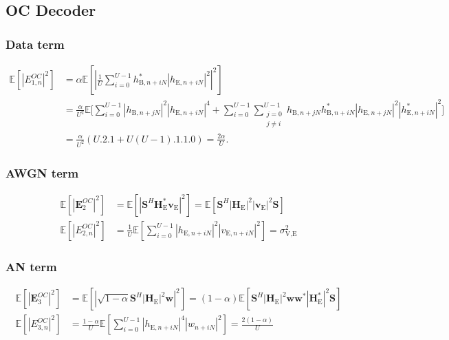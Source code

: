 \documentclass[12pt, draftclsnofoot, onecolumn]{IEEEtran}
\newcommand{\module}[1]{\left|#1\right|}
\newcommand{\EX}[1]{\mathbb{E} \left[#1\right]}%
\newcommand{\HE}{\textbf{H}_{\text{E}}}
\newcommand{\ve}{\textbf{v}_{\text{E}}}
\newcommand{\spread}{\textbf{S}}
\newcommand{\w}{\textbf{w}}
\begin{document}
\subsection{OC Decoder}\label{sec:own-channel-knowledge-app}
\subsubsection{Data term}\label{sec:data-term-app-3}
\begin{equation}
\begin{split}
\EX{|E_{1,n}^{OC}|^2}  &= \alpha \EX{\left|\frac{1}{U}\sum_{i=0}^{U-1} h_{\text{B}, n + iN}^* \left| h_{\text{E}, n + iN}\right|^2\right|^2} \\
&=\frac{\alpha}{U^2} \mathbb{E}\Bigg[ \sum_{i=0}^{U-1} \left| h_{\text{B}, n + jN}\right|^2 \left| h_{\text{E}, n + iN}\right|^4 
+ \sum_{i=0}^{U-1}\sum_{\substack{j=0 \\ j\neq i}}^{U-1}  h_{\text{B}, n + jN} h^*_{\text{B}, n + iN} \left| h_{\text{E}, n + jN}\right|^2 \left| h^*_{\text{E}, n + iN}\right|^2 \Bigg] \\
&= \frac{\alpha}{U^2} \left(U.2.1 + U(U-1).1.1.0\right) = \frac{2\alpha}{U}.
\end{split}
\label{eq:data_eve_filt5-app}
\end{equation}


\subsubsection{AWGN term}\label{sec:awgn-term-app-3}
\begin{equation}
	\begin{split}
		\EX{|\textbf{E}_{2}^{OC}|^2} &=  \EX{\module{\spread^H \HE^* \ve}^2} 
		=\EX{\spread^H   \left|\HE\right|^2  \left|\ve\right|^2 \spread } \\
		\EX{|E_{2,n}^{OC}|^2} &= \frac{1}{U} \EX{\sum_{i=0}^{U-1} |h_{\text{E}, n + iN}|^2 |v_{\text{E}, n + iN}|^2} = \sigma^2_{\text{V,E}}
	\end{split}
	\label{eq:noise_eve_filt5-app}
\end{equation}

\subsubsection{AN term}\label{sec:an-term-app-3}
\begin{equation}
	\begin{split}
		\EX{|\textbf{E}_{3}^{OC}|^2} &=  \EX{\module{\sqrt{1-\alpha}\spread^H \left|\HE\right|^2 \w}^2}  =(1-\alpha)\EX{\spread^H \left|\HE\right|^2 \w\w^* \left|\HE^*\right|^2\spread } \\
		\EX{|E_{3,n}^{OC}|^2}  &= \frac{1-\alpha}{U} \EX{\sum_{i=0}^{U-1} |h_{\text{E}, n + iN}|^4 |w_{n + iN}|^2} = \frac{2(1-\alpha)}{U}
	\end{split}
	\label{eq:an_eve_filt5-app}
\end{equation}
\end{document}
